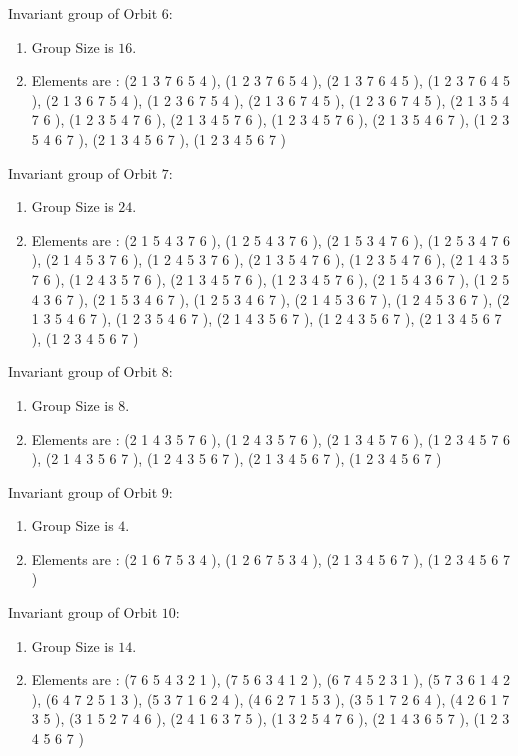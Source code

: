 \documentclass[12pt]{article}
\begin{document}
Invariant group of Orbit $6$:
\begin{enumerate}
\item Group Size is $16$.
\item Elements are : (2 1 3 7 6 5 4  ), (1 2 3 7 6 5 4  ), (2 1 3 7 6 4 5  ), (1 2 3 7 6 4 5  ), (2 1 3 6 7 5 4  ), (1 2 3 6 7 5 4  ), (2 1 3 6 7 4 5  ), (1 2 3 6 7 4 5  ), (2 1 3 5 4 7 6  ), (1 2 3 5 4 7 6  ), (2 1 3 4 5 7 6  ), (1 2 3 4 5 7 6  ), (2 1 3 5 4 6 7  ), (1 2 3 5 4 6 7  ), (2 1 3 4 5 6 7  ), (1 2 3 4 5 6 7  )
\end{enumerate}
Invariant group of Orbit $7$:
\begin{enumerate}
\item Group Size is $24$.
\item Elements are : (2 1 5 4 3 7 6  ), (1 2 5 4 3 7 6  ), (2 1 5 3 4 7 6  ), (1 2 5 3 4 7 6  ), (2 1 4 5 3 7 6  ), (1 2 4 5 3 7 6  ), (2 1 3 5 4 7 6  ), (1 2 3 5 4 7 6  ), (2 1 4 3 5 7 6  ), (1 2 4 3 5 7 6  ), (2 1 3 4 5 7 6  ), (1 2 3 4 5 7 6  ), (2 1 5 4 3 6 7  ), (1 2 5 4 3 6 7  ), (2 1 5 3 4 6 7  ), (1 2 5 3 4 6 7  ), (2 1 4 5 3 6 7  ), (1 2 4 5 3 6 7  ), (2 1 3 5 4 6 7  ), (1 2 3 5 4 6 7  ), (2 1 4 3 5 6 7  ), (1 2 4 3 5 6 7  ), (2 1 3 4 5 6 7  ), (1 2 3 4 5 6 7  )
\end{enumerate}
Invariant group of Orbit $8$:
\begin{enumerate}
\item Group Size is $8$.
\item Elements are : (2 1 4 3 5 7 6  ), (1 2 4 3 5 7 6  ), (2 1 3 4 5 7 6  ), (1 2 3 4 5 7 6  ), (2 1 4 3 5 6 7  ), (1 2 4 3 5 6 7  ), (2 1 3 4 5 6 7  ), (1 2 3 4 5 6 7  )
\end{enumerate}
Invariant group of Orbit $9$:
\begin{enumerate}
\item Group Size is $4$.
\item Elements are : (2 1 6 7 5 3 4  ), (1 2 6 7 5 3 4  ), (2 1 3 4 5 6 7  ), (1 2 3 4 5 6 7  )
\end{enumerate}
Invariant group of Orbit $10$:
\begin{enumerate}
\item Group Size is $14$.
\item Elements are : (7 6 5 4 3 2 1  ), (7 5 6 3 4 1 2  ), (6 7 4 5 2 3 1  ), (5 7 3 6 1 4 2  ), (6 4 7 2 5 1 3  ), (5 3 7 1 6 2 4  ), (4 6 2 7 1 5 3  ), (3 5 1 7 2 6 4  ), (4 2 6 1 7 3 5  ), (3 1 5 2 7 4 6  ), (2 4 1 6 3 7 5  ), (1 3 2 5 4 7 6  ), (2 1 4 3 6 5 7  ), (1 2 3 4 5 6 7  )
\end{enumerate}
\end{document}
